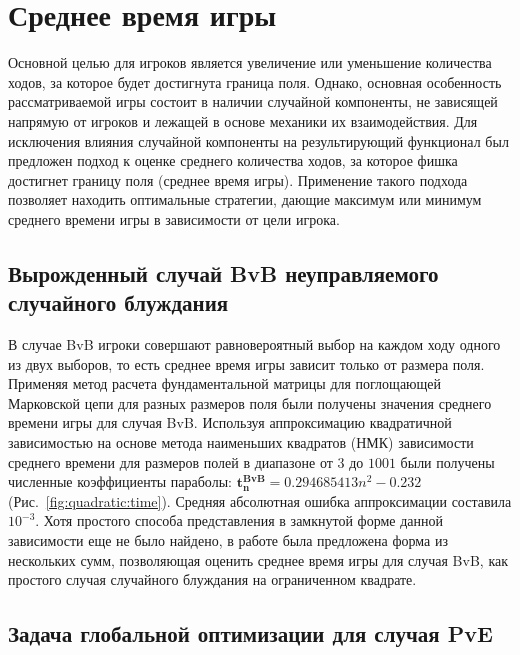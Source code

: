 \section{Среднее время игры}\label{sec:ch3/sec1}

Основной целью для игроков является увеличение или уменьшение количества ходов, за которое будет достигнута граница поля.
Однако, основная особенность рассматриваемой игры состоит в наличии случайной компоненты, не зависящей напрямую от игроков и лежащей в основе механики их взаимодействия.
Для исключения влияния случайной компоненты на результирующий функционал был предложен подход к оценке среднего количества ходов,
за которое фишка достигнет границу поля (среднее время игры).
Применение такого подхода позволяет находить оптимальные стратегии, дающие максимум или минимум среднего времени игры в зависимости от цели игрока.

\subsection{Вырожденный случай BvB неуправляемого случайного блуждания}\label{subsec:ch3/sec1/sub1}

В случае BvB игроки совершают равновероятный выбор на каждом ходу одного из двух выборов, то есть среднее время игры зависит только от размера поля.
Применяя метод расчета фундаментальной матрицы для поглощающей Марковской цепи для разных размеров поля были получены значения среднего времени игры для случая BvB.
Используя аппроксимацию квадратичной зависимостью на основе метода наименьших квадратов (НМК) зависимости среднего времени для размеров полей в диапазоне от $3$ до $1001$
были получены численные коэффициенты параболы: $\boldsymbol{t_n^{BvB}} = 0.294685413 n^2 - 0.232$ (Рис.~\cref{fig:quadratic:time}). Средняя абсолютная ошибка аппроксимации составила $10^{-3}$. 
Хотя простого способа представления в замкнутой форме данной зависимости еще не было найдено, в работе \cite{} была предложена форма из нескольких сумм, позволяющая оценить
среднее время игры для случая BvB, как простого случая случайного блуждания на ограниченном квадрате.

\subsection{Задача глобальной оптимизации для случая PvE}\label{subsec:ch3/sec1/sub2}

